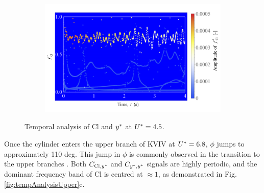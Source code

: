 \documentclass[oneside]{utmthesis}
\begin{document}
\begin{figure} \continuedfloat
  \centering
  \begin{subfigure}[h]{1\textwidth}
    \includegraphics[width=\textwidth]{figs/tempAnalysisKVIV-c}
    \caption{}
    \label{fig:tempAnalysisKVIV-c}
  \end{subfigure}

  \caption{Temporal analysis of Cl and $y^{*}$ at $U^{*} = 4.5$.} \label{fig:tempAnalysisKVIV}
\end{figure}

Once the cylinder enters the upper branch of KVIV at $U^{*} = 6.8$, $\phi$ jumps to approximately 110 deg. This jump in $\phi$ is commonly observed in the transition to the upper branches \citep{Maruai2018}. Both $C_{\text{Cl},y^{*}}$ and $C_{y^{*},y^{*}}$ signals are highly periodic, and the dominant frequency band of Cl is centred at $\approx 1$, as demonstrated in Fig. \ref{fig:tempAnalysisUpper}c.
\end{document}
